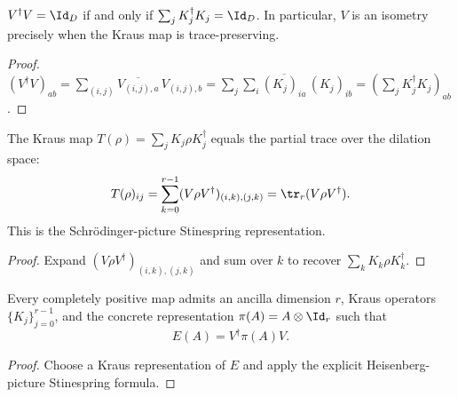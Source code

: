 \begin{theorem}\label{thm:stinespringV_isometry_iff_kraus_normalized}
    \leanok
    $V^\dagger V = \Id_D$ if and only if
    $\sum_j K_j^\dagger K_j = \Id_D$.
    In particular, $V$ is an isometry precisely when the Kraus map is
    trace-preserving.
\end{theorem}

\begin{proof}
    \leanok
    $(V^\dagger V)_{ab}
        = \sum_{(i,j)} \overline{V_{(i,j),a}}\,V_{(i,j),b}
        = \sum_j \sum_i \overline{(K_j)_{ia}}\,(K_j)_{ib}
        = (\sum_j K_j^\dagger K_j)_{ab}$.
\end{proof}

\begin{theorem}\label{thm:stinespring_schrodinger_representation}
    \leanok
    The Kraus map $T(\rho) = \sum_j K_j \rho K_j^\dagger$ equals
    the partial trace over the dilation space:
    \[
        T(\rho)_{ij}
        = \sum_{k=0}^{r-1}
        (V \rho V^\dagger)_{(i,k),(j,k)}
        = \tr_r(V\rho V^\dagger).
    \]
    This is the Schr\"odinger-picture Stinespring representation.
\end{theorem}

\begin{proof}
    \leanok
    Expand $(V\rho V^\dagger)_{(i,k),(j,k)}$
    and sum over $k$ to recover $\sum_k K_k \rho K_k^\dagger$.
\end{proof}

\begin{theorem}
    \label{thm:exists_stinespring_dilation}
    \leanok
    Every completely positive map admits an ancilla dimension $r$, Kraus operators
    $\{K_j\}_{j=0}^{r-1}$, and the concrete representation
    $\pi(A) = A \otimes \Id_r$ such that
    \[
        E(A) = V^\dagger \pi(A) V.
    \]
\end{theorem}

\begin{proof}\leanok
    Choose a Kraus representation of $E$ and apply the explicit Heisenberg-picture
    Stinespring formula.
\end{proof}

